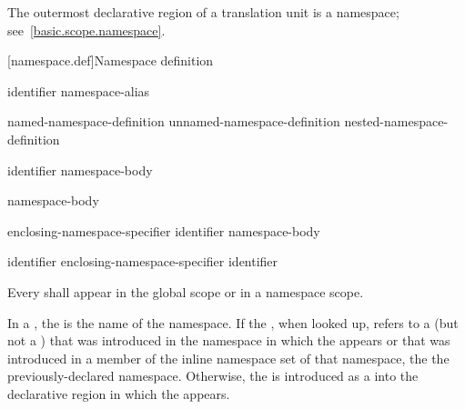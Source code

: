 \pnum
The outermost declarative region of a translation unit is a namespace;
see~\ref{basic.scope.namespace}.

[namespace.def]{Namespace definition}%
%

\begin{bnf}
\br
        identifier\br
        namespace-alias
\end{bnf}

\begin{bnf}
\br
        named-namespace-definition\br
        unnamed-namespace-definition\br
        nested-namespace-definition
\end{bnf}

\begin{bnf}
\br
           identifier \terminal{\{} namespace-body \terminal{\}}
\end{bnf}

\begin{bnf}
\br
           \terminal{\{} namespace-body \terminal{\}}
\end{bnf}

\begin{bnf}
\br
         enclosing-namespace-specifier \terminal{::}  identifier \terminal{\{} namespace-body \terminal{\}}
\end{bnf}

\begin{bnf}
\br
        identifier\br
        enclosing-namespace-specifier \terminal{::}  identifier
\end{bnf}

\begin{bnf}
\br
\end{bnf}

\pnum
Every  shall appear in the global scope
or in a namespace scope.

\pnum
In a ,
the  is the name of the namespace.
If the , when looked up,
refers to a  (but not a )
that was introduced in the namespace
in which the  appears
or that was introduced in a member of the inline namespace set of that namespace,
the 
 the previously-declared namespace.
Otherwise, the  is introduced
as a  into the declarative region
in which the  appears.

